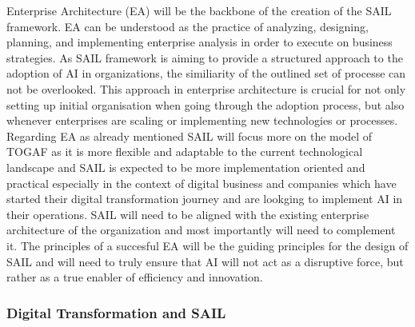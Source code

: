 \documentclass[]{imc-inf}
\begin{document}
Enterprise Architecture (EA) will be the backbone of the creation of the
SAIL framework. EA can be understood as the practice of analyzing,
designing, planning, and implementing enterprise analysis in order to
execute on business strategies. As SAIL framework is aiming to provide a
structured approach to the adoption of AI in organizations, the
similiarity of the outlined set of processe can not be overlooked. This
approach in enterprise architecture is crucial for not only setting up
initial organisation when going through the adoption process, but also
whenever enterprises are scaling or implementing new technologies or
processes. Regarding EA as already mentioned SAIL will focus more on the
model of TOGAF as it is more flexible and adaptable to the current
technological landscape and SAIL is expected to be more implementation
oriented and practical especially in the context of digital business and
companies which have started their digital transformation journey and
are lookging to implement AI in their operations. SAIL will need to be
aligned with the existing enterprise architecture of the organization
and most importantly will need to complement it. The principles of a
succesful EA will be the guiding principles for the design of SAIL and
will need to truly ensure that AI will not act as a disruptive force,
but rather as a true enabler of efficiency and innovation.

\subsubsection{Digital Transformation and
	SAIL}\label{digital-transformation-and-sail}
\end{document}
